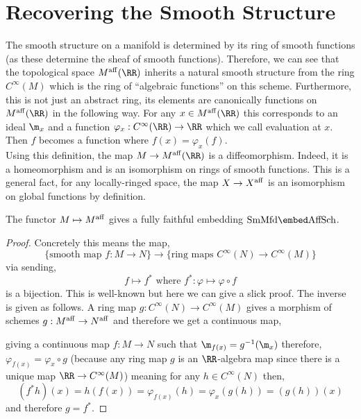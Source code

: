 \documentclass[12pt]{article}
\begin{document}
\section{Recovering the Smooth Structure}

The smooth structure on a manifold is determined by its ring of smooth functions (as these determine the sheaf of smooth functions). Therefore, we can see that the topological space $M^{\aff}(\RR)$ inherits a natural smooth structure from the ring $C^{\infty}(M)$ which is the ring of ``algebraic functions'' on this scheme. Furthermore, this is not just an abstract ring, its elements are canonically functions on $M^{\aff}(\RR)$ in the following way. For any $x \in M^{\aff}(\RR)$ this corresponds to an ideal $\m_x$ and a function $\varphi_x : C^{\infty}(\RR) \to \RR$ which we call evaluation at $x$. Then $f$ becomes a function where $f(x) = \varphi_x(f)$. 
\bigskip\\
Using this definition, the map $M \to M^{\aff}(\RR)$ is a diffeomorphism. Indeed, it is a homeomorphism and is an isomorphism on rings of smooth functions. This is a general fact, for any locally-ringed space, the map $X \to X^{\mathrm{aff}}$ is an isomorphism on global functions by definition.

\begin{prop}
The functor $M \mapsto M^{\mathrm{aff}}$ gives a fully faithful embedding $\mathrm{SmMfd} \embed \mathrm{AffSch}$.
\end{prop}

\begin{proof}
Concretely this means the map,
\[ \{ \text{smooth map } f : M \to N \} \to \{ \text{ring maps } C^{\infty}(N) \to C^{\infty}(M) \} \] 
via sending,
\[ f \mapsto f^* \text{ where } f^* : \varphi \mapsto \varphi \circ f \]
is a bijection. This is well-known but here we can give a slick proof. The inverse is given as follows. A ring map $g : C^{\infty}(N) \to C^{\infty}(M)$ gives a morphism of schemes $g : M^{\mathrm{aff}} \to N^{\mathrm{aff}}$ and therefore we get a continuous map,
\begin{center}
\end{center}
giving a continuous map $f : M \to N$ such that $\m_{f(x)} = g^{-1}(\m_x)$ therefore, $\varphi_{f(x)} = \varphi_x \circ g$ (because any ring map $g$ is an $\RR$-algebra map since there is a unique map $\RR \to C^{\infty}(M)$) meaning for any $h \in C^{\infty}(N)$ then,
\[ (f^* h)(x) = h(f(x)) = \varphi_{f(x)}(h) = \varphi_x(g(h)) = (g(h))(x) \]
and therefore $g = f^*$. 
\end{proof}
\end{document}
